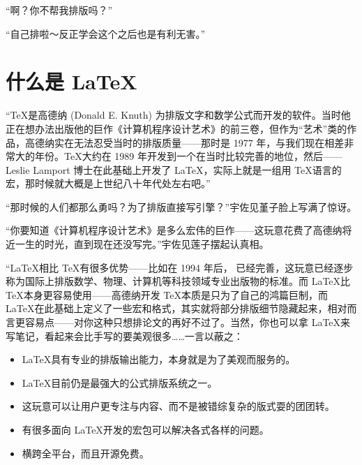 “啊？你不帮我排版吗？”

“自己排啦～反正学会这个之后也是有利无害。”

\section{什么是 \LaTeX}

“\TeX 是高德纳 (Donald E. Knuth) 为排版文字和数学公式而开发的软件。当时他正在想办法出版他的巨作《计算机程序设计艺术》的前三卷，但作为“艺术”类的作品，高德纳实在无法忍受当时的排版质量——那时是 1977 年，与我们现在相差非常大的年份。\TeX 大约在 1989 年开发到一个在当时比较完善的地位，然后—— Leslie Lamport 博士在此基础上开发了 \LaTeX，实际上就是一组用 \TeX 语言的宏，那时候就大概是上世纪八十年代处左右吧。”

“那时候的人们都那么勇吗？为了排版直接写引擎？”宇佐见堇子脸上写满了惊讶。

“你要知道《计算机程序设计艺术》是多么宏伟的巨作——这玩意花费了高德纳将近一生的时光，直到现在还没写完。”宇佐见莲子摆起认真相。

“\LaTeX 相比 \TeX 有很多优势——比如在 1994 年后，\LaTeXe{} 已经完善，这玩意已经逐步称为国际上排版数学、物理、计算机等科技领域专业出版物的标准。而 \LaTeX 比 \TeX 本身更容易使用——高德纳开发 \TeX 本质是只为了自己的鸿篇巨制，而 \LaTeX 在此基础上定义了一些宏和格式，其实就将部分排版细节隐藏起来，相对而言更容易点——对你这种只想排论文的再好不过了。当然，你也可以拿 \LaTeX 来写笔记，看起来会比手写的要美观很多……一言以蔽之：

\begin{center}
    \begin{tcolorbox}[enhanced, breakable,
            colback = white!90!black, colframe = white!40!black, colbacktitle = cyan,
            boxsep=2mm, width=14cm,
            boxed title style = {sharp corners}]\itshapeCJK
        \begin{itemize}
            \item \LaTeX 具有专业的排版输出能力，本身就是为了美观而服务的。
            \item \LaTeX 目前仍是最强大的公式排版系统之一。
            \item 这玩意可以让用户更专注与内容、而不是被错综复杂的版式耍的团团转。%
            \item 有很多面向 \LaTeX 开发的宏包可以解决各式各样的问题。
            \item 横跨全平台，而且开源免费。
        \end{itemize}
    \end{tcolorbox}
\end{center}

